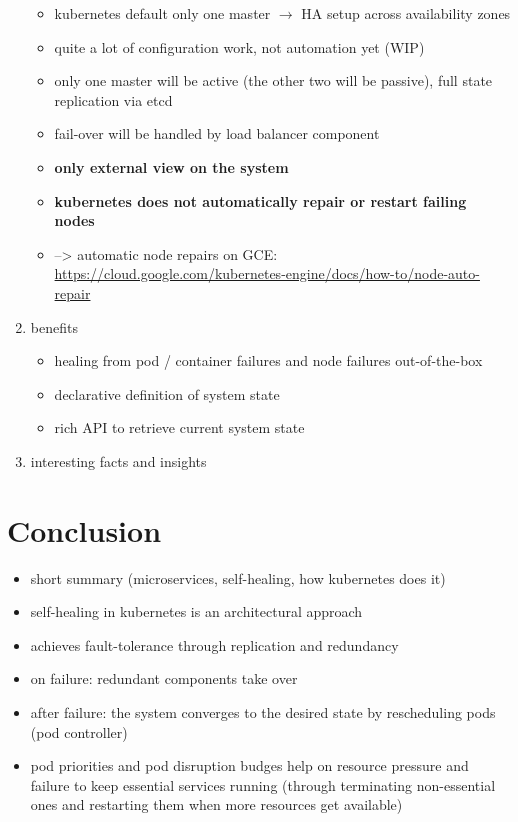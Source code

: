 \begin{enumerate}
\begin{itemize}
        \item \gls{kubernetes} default only one master $\rightarrow$ HA setup across availability zones
        \item quite a lot of configuration work, not automation yet (WIP)
        \item only one master will be active (the other two will be passive), full state replication via etcd
        \item fail-over will be handled by load balancer component
        \item \textbf{only external view on the system}
        \item \textbf{\gls{kubernetes} does not automatically repair or restart failing nodes}
        \item --> automatic node repairs on GCE: \url{https://cloud.google.com/kubernetes-engine/docs/how-to/node-auto-repair}
      \end{itemize}
    \item benefits
      \begin{itemize}
        \item healing from pod / container failures and node failures out-of-the-box
        \item declarative definition of system state
        \item rich API to retrieve current system state
      \end{itemize}
    \item interesting facts and insights
  \end{enumerate}
 
\section{Conclusion}
  \begin{itemize}
    \item short summary (microservices, self-healing, how \gls{kubernetes} does it)
    \item self-healing in \gls{kubernetes} is an architectural approach
    \item achieves fault-tolerance through replication and redundancy
    \item on failure: redundant components take over
    \item after failure: the system converges to the desired state by rescheduling pods (pod controller)
    \item pod priorities and pod disruption budges help on resource pressure and failure to keep essential services running (through terminating non-essential ones and restarting them when more resources get available)
  \end{itemize}